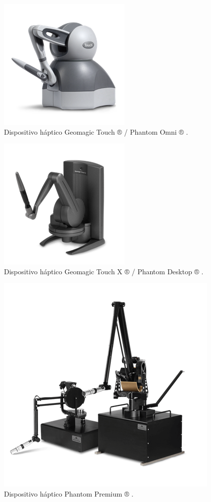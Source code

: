\begin{figure}[ht!]
    \centering
    \includegraphics[width=0.4\linewidth]{capitulos/figuras/hapticoTouch.png}
    \caption{Dispositivo háptico Geomagic Touch ® / Phantom Omni ® \cite{3DSystems2018}.}
    \label{fig:hapticoTouch}
\end{figure}

\begin{figure}[ht!]
    \centering
    \includegraphics[width=0.4\linewidth]{capitulos/figuras/hapticoTouchX.png}
    \caption{Dispositivo háptico Geomagic Touch X ® / Phantom Desktop ® \cite{3DSystems2018}.}
    \label{fig:hapticoTouchX}
\end{figure}


\begin{figure}[ht!]
    \centering
    \includegraphics[width=0.4\linewidth]{capitulos/figuras/hapticoPhantomPremium.png}
    \caption{Dispositivo háptico Phantom Premium ® \cite{3DSystems2018}.}
    \label{fig:hapticoPremium}
\end{figure}

